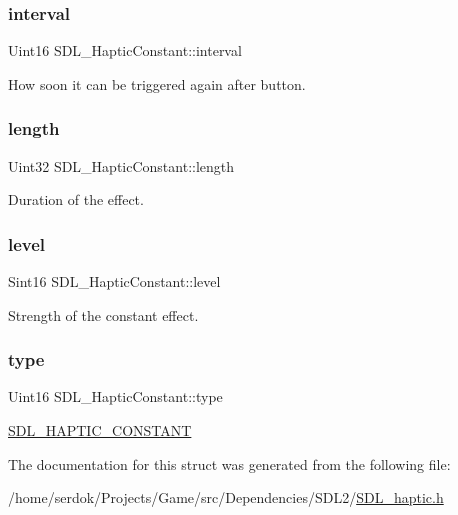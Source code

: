 \subsubsection{\texorpdfstring{interval}{interval}}
{\footnotesize\ttfamily Uint16 S\+D\+L\+\_\+\+Haptic\+Constant\+::interval}

How soon it can be triggered again after button. \mbox{\label{structSDL__HapticConstant_aeb994c356b1d236b060f277d157e98ec}} 
\subsubsection{\texorpdfstring{length}{length}}
{\footnotesize\ttfamily Uint32 S\+D\+L\+\_\+\+Haptic\+Constant\+::length}

Duration of the effect. \mbox{\label{structSDL__HapticConstant_a5b095eea77464623ed57af15f29f4ca6}} 
\subsubsection{\texorpdfstring{level}{level}}
{\footnotesize\ttfamily Sint16 S\+D\+L\+\_\+\+Haptic\+Constant\+::level}

Strength of the constant effect. \mbox{\label{structSDL__HapticConstant_a5cb31202803a8bc1be95fcede5ac8afb}} 
\subsubsection{\texorpdfstring{type}{type}}
{\footnotesize\ttfamily Uint16 S\+D\+L\+\_\+\+Haptic\+Constant\+::type}

\hyperlink{SDL__haptic_8h_a955fb9f680dcf9cc72a3d5263e85b80a}{S\+D\+L\+\_\+\+H\+A\+P\+T\+I\+C\+\_\+\+C\+O\+N\+S\+T\+A\+NT} 

The documentation for this struct was generated from the following file\+:\begin{DoxyCompactItemize}
\item 
/home/serdok/\+Projects/\+Game/src/\+Dependencies/\+S\+D\+L2/\hyperlink{SDL__haptic_8h}{S\+D\+L\+\_\+haptic.\+h}\end{DoxyCompactItemize}
